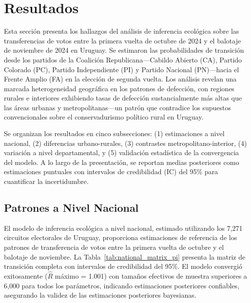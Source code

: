 ﻿%

\section{Resultados}
\label{sec:resultados}

Esta sección presenta los hallazgos del análisis de inferencia ecológica sobre las transferencias de votos entre la primera vuelta de octubre de 2024 y el balotaje de noviembre de 2024 en Uruguay. Se estimaron las probabilidades de transición desde los partidos de la Coalición Republicana---Cabildo Abierto (CA), Partido Colorado (PC), Partido Independiente (PI) y Partido Nacional (PN)---hacia el Frente Amplio (FA) en la elección de segunda vuelta. Los análisis revelan una marcada heterogeneidad geográfica en los patrones de defección, con regiones rurales e interiores exhibiendo tasas de defección sustancialmente más altas que las áreas urbanas y metropolitanas---un patrón que contradice los supuestos convencionales sobre el conservadurismo político rural en Uruguay.

Se organizan los resultados en cinco subsecciones: (1) estimaciones a nivel nacional, (2) diferencias urbano-rurales, (3) contrastes metropolitano-interior, (4) variación a nivel departamental, y (5) validación estadística de la convergencia del modelo. A lo largo de la presentación, se reportan medias posteriores como estimaciones puntuales con intervalos de credibilidad (IC) del 95\% para cuantificar la incertidumbre.

\subsection{Patrones a Nivel Nacional}
\label{sec:resultados_nacional}

El modelo de inferencia ecológica a nivel nacional, estimado utilizando los 7,271 circuitos electorales de Uruguay, proporciona estimaciones de referencia de los patrones de transferencia de votos entre la primera vuelta de octubre y el balotaje de noviembre. La Tabla~\ref{tab:national_matrix_pi} presenta la matriz de transición completa con intervalos de credibilidad del 95\%. El modelo convergió exitosamente ($\hat{R}$ máximo = 1.001) con tamaños efectivos de muestra superiores a 6,000 para todos los parámetros, indicando estimaciones posteriores confiables, asegurando la validez de las estimaciones posteriores bayesianas.

